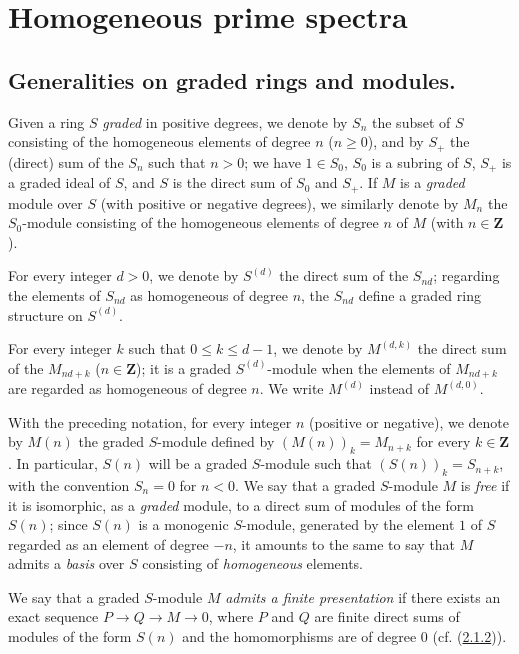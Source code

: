 \section{Homogeneous prime spectra}
\label{section:II.2}

\subsection{Generalities on graded rings and modules.}
\label{subsection:II.2.1}

\begin{notation}[2.1.1]
\label{II.2.1.1}
Given a ring $S$ \emph{graded} in positive degrees, we denote
by $S_n$ the subset of $S$ consisting of the homogeneous elements of degree
$n$ ($n\geq0$), and by $S_+$ the (direct) sum of the $S_n$ such that $n>0$;
we have $1\in S_0$, $S_0$ is a subring of $S$, $S_+$ is a graded ideal of
$S$, and $S$ is the direct sum of $S_0$ and $S_+$. If $M$ is a \emph{graded}
module over $S$ (with positive or negative degrees), we similarly denote by
$M_n$ the $S_0$-module consisting of the homogeneous elements of degree $n$
of $M$ (with $n\in\mathbf{Z}$).

For every integer $d>0$, we denote by $S^{(d)}$ the direct sum of the
$S_{nd}$; regarding the elements of $S_{nd}$ as homogeneous of degree
$n$, the $S_{nd}$ define a graded ring structure on $S^{(d)}$.

For every integer $k$ such that $0\leq k\leq d-1$, we denote by
$M^{(d,k)}$ the direct sum
of the $M_{nd+k}$ ($n\in\mathbf{Z}$); it is a graded $S^{(d)}$-module when
the elements of $M_{nd+k}$ are regarded as homogeneous of degree $n$. We
write $M^{(d)}$ instead of $M^{(d,0)}$.

With the preceding notation, for every integer $n$ (positive or negative),
we denote by $M(n)$ the graded $S$-module defined by
$(M(n))_k=M_{n+k}$ for every $k\in\mathbf{Z}$. In particular, $S(n)$ will be
a graded $S$-module such that $(S(n))_k=S_{n+k}$, with the convention
$S_n=0$ for $n<0$. We say that a graded $S$-module $M$ is \emph{free}
if it is isomorphic, as a \emph{graded} module, to a direct sum of
modules of the form $S(n)$; since $S(n)$ is a monogenic $S$-module,
generated by the element $1$ of $S$ regarded as an element of degree $-n$,
it amounts to the same to say that $M$ admits a \emph{basis} over $S$
consisting of \emph{homogeneous} elements.

We say that a graded $S$-module $M$ \emph{admits a finite presentation} if
there exists an exact sequence $P\to Q\to M\to0$, where $P$ and $Q$ are
finite direct sums of modules of the form $S(n)$ and the homomorphisms are
of degree $0$ (cf. (\hyperref[II.2.1.2]{2.1.2})).
\end{notation}

